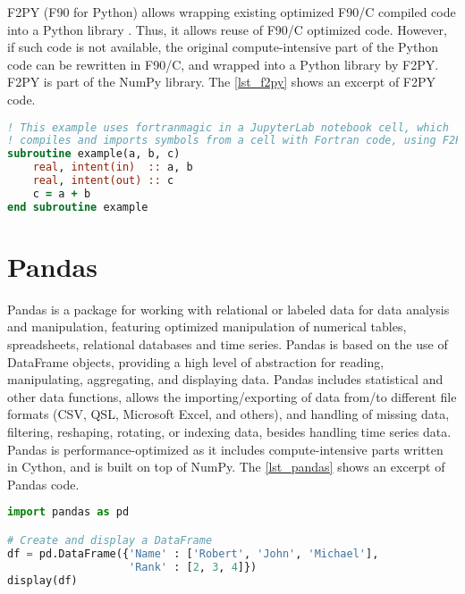 F2PY (F90 for Python) allows wrapping existing optimized F90/C compiled code into a Python library \cite {Peterson2009}. Thus, it allows reuse of F90/C optimized code. However, if such code is not available, the original compute-intensive part of the Python code can be rewritten in F90/C, and wrapped into a Python library by F2PY. F2PY is part of the NumPy library. The \autoref {lst_f2py} shows an excerpt of F2PY code.

\begin{lstlisting}[float=htb, language={fortran}, label={lst_f2py}, caption={Excerpt of F2PY code.}]
%%fortran
! This example uses fortranmagic in a JupyterLab notebook cell, which 
! compiles and imports symbols from a cell with Fortran code, using F2PY.
subroutine example(a, b, c)
    real, intent(in)  :: a, b
    real, intent(out) :: c
    c = a + b
end subroutine example
\end{lstlisting}

%
%
%
\section{Pandas}

Pandas \cite {McKinney2011} is a package for working with relational or labeled data for data analysis and manipulation, featuring optimized manipulation of numerical tables, spreadsheets, relational databases and time series. Pandas is based on the use of DataFrame objects, providing a high level of abstraction for reading, manipulating, aggregating, and displaying data. Pandas includes statistical and other data functions, allows the importing/exporting of data from/to different file formats (CSV, QSL, Microsoft Excel, and others), and handling of missing data, filtering, reshaping, rotating, or indexing data, besides handling time series data. Pandas is performance-optimized as it includes compute-intensive parts written in Cython, and is built on top of NumPy. The \autoref {lst_pandas} shows an excerpt of Pandas code.

\begin{lstlisting}[float=htb, language={Python}, label={lst_pandas}, caption={Excerpt of Pandas code.}]
import pandas as pd

# Create and display a DataFrame
df = pd.DataFrame({'Name' : ['Robert', 'John', 'Michael'],
                   'Rank' : [2, 3, 4]})
display(df)
\end{lstlisting}

